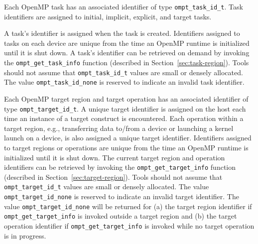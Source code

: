  
Each OpenMP task has an associated identifier of type
\verb|ompt_task_id_t|. Task identifiers are assigned to
initial, implicit, explicit, and target tasks.
\begin{comment}
\begin{quote}
\begin{verbatim}
typedef uint64_t ompt_task_id_t;
\end{verbatim}
\end{quote}
\end{comment} 
  A task's identifier is assigned
  when the task is created. 
  Identifiers assigned to tasks on each device are unique from the time an 
  OpenMP runtime is initialized until it is shut down. 
  A task's identifier can be retrieved
  on demand by invoking the \verb|ompt_get_task_info|  function (described in Section~\ref{sec:task-region}).
  Tools should not assume that \verb|ompt_task_id_t| values are small or densely allocated. 
  The value \verb|ompt_task_id_none| is reserved to indicate an invalid task identifier.
  
Each OpenMP target region and target operation has an associated identifier of type \verb|ompt_target_id_t|. 
A unique target identifier is assigned on the host each time an instance of a target construct is encountered.
Each operation within a target region, e.g., transferring data to/from a device or launching a kernel launch 
on a device, is also assigned a unique target identifier. 
Identifiers assigned to target regions or operations 
are unique from the time an OpenMP runtime is initialized until it is shut down. 
The current target region and operation identifiers can be retrieved by invoking the \verb|ompt_get_target_info| function (described in Section~\ref{sec:target-region}).
Tools should not assume that \verb|ompt_target_id_t| values are small or densely allocated. 
The value \verb|ompt_target_id_none| is reserved to indicate an invalid target identifier. 
The value \verb|ompt_target_id_none| will be returned for (a) the target region identifier if \verb|ompt_get_target_info| is invoked outside a target region and (b) the target operation identifier if \verb|ompt_get_target_info| is invoked while no target operation is in progress.


